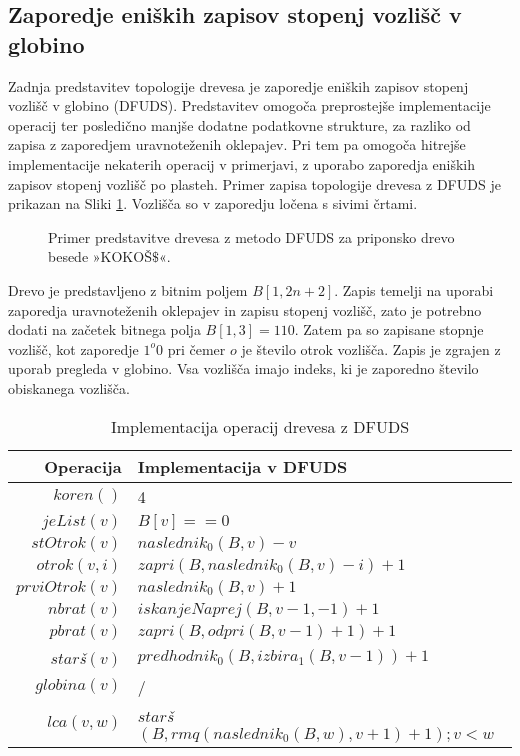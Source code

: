 \subsection{Zaporedje eniških zapisov stopenj vozlišč v globino}\label{sec:DFUDS}

Zadnja predstavitev topologije drevesa je zaporedje eniških zapisov stopenj vozlišč v globino (DFUDS). Predstavitev omogoča preprostejše implementacije operacij ter posledično manjše dodatne podatkovne strukture, za razliko od zapisa z zaporedjem uravnoteženih oklepajev. Pri tem pa omogoča hitrejše implementacije nekaterih operacij v primerjavi, z uporabo zaporedja eniških zapisov stopenj vozlišč po plasteh. Primer zapisa topologije drevesa z DFUDS je prikazan na Sliki \ref{fig:DFUDS}. Vozlišča so v zaporedju ločena s sivimi črtami.

\begin{figure}[htb]
    \begin{center}
        
        \caption{Primer predstavitve drevesa z metodo DFUDS za priponsko drevo besede »KOKOŠ$\$$«.} 
        \label{fig:DFUDS}
    \end{center}
\end{figure}

Drevo je predstavljeno z bitnim poljem $B[1,2n+2]$. Zapis temelji na uporabi zaporedja uravnoteženih oklepajev in zapisu stopenj vozlišč, zato je potrebno dodati na začetek bitnega polja $B[1,3]=110$. Zatem pa so zapisane stopnje vozlišč, kot zaporedje $1^o0$ pri čemer $o$ je število otrok vozlišča. Zapis je zgrajen z uporab pregleda v globino. Vsa vozlišča imajo indeks, ki je zaporedno število obiskanega vozlišča.

\begin{table}[htb]
    \centering
    \caption{Implementacija operacij drevesa z DFUDS}
    \begin{tabular}{r|l}
\textbf{Operacija}& \textbf{Implementacija v DFUD}S \\\hline
         $koren()$& 4\\
         $jeList(v)$& $B[v]==0$\\
         $stOtrok(v)$& $naslednik_0(B,v)-v$\\
         $otrok(v,i)$& $zapri(B, naslednik_0(B, v) - i)+1$\\
         $prviOtrok(v)$& $naslednik_0(B,v)+1$\\
         $nbrat(v)$& $iskanjeNaprej(B,v-1,-1)+1$ \\
         $pbrat(v)$& $zapri(B,odpri(B,v-1)+1)+1$ \\
         $star$\textit{š}$(v)$& $predhodnik_0(B,izbira_1(B,v-1))+1$ \\
         $globina(v)$& / \\
         $lca(v,w)$&  $star$\textit{š}$(B,rmq(naslednik_0(B,w),v+1)+1);v<w$\\

    \end{tabular}
    \label{tab:DFUDSop}
\end{table}


